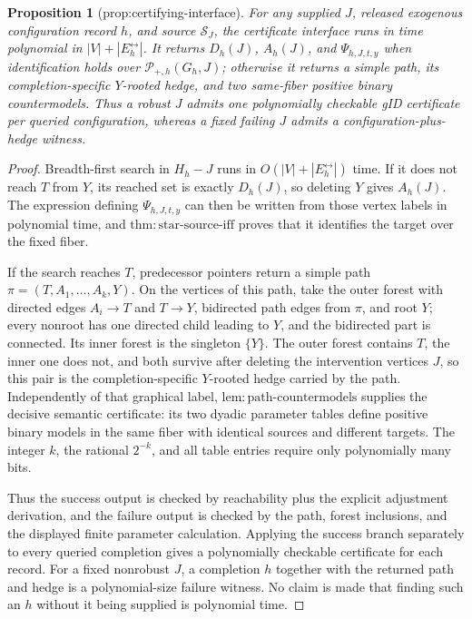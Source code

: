\documentclass{article}
\newtheorem{proposition}{Proposition}
\begin{document}
\begin{proposition}[prop:certifying-interface]\label{prop:certifying-interface}
For any supplied \(J\), released exogenous configuration record \(h\), and source \(\mathcal S_J\), the certificate interface runs in time polynomial in \(|V|+|E_h^{\leftrightarrow}|\). It returns \(D_h(J)\), \(A_h(J)\), and \(\Psi_{h,J,t,y}\) when identification holds over \(\mathcal P_{+,h}(G_h,J)\); otherwise it returns a simple path, its completion-specific \(Y\)-rooted hedge, and two same-fiber positive binary countermodels. Thus a robust \(J\) admits one polynomially checkable gID certificate per queried configuration, whereas a fixed failing \(J\) admits a configuration-plus-hedge witness.
\end{proposition}
\begin{proof}
Breadth-first search in \(H_h-J\) runs in \(O(|V|+|E_h^{\leftrightarrow}|)\) time.  If it does not reach \(T\) from \(Y\), its reached set is exactly \(D_h(J)\), so deleting \(Y\) gives \(A_h(J)\).  The expression defining \(\Psi_{h,J,t,y}\) can then be written from those vertex labels in polynomial time, and \(\mathrm{thm{:}star\text{-}source\text{-}iff}\) proves that it identifies the target over the fixed fiber.

If the search reaches \(T\), predecessor pointers return a simple path \(\pi=(T,A_1,\ldots,A_k,Y)\).  On the vertices of this path, take the outer forest with directed edges \(A_i\to T\) and \(T\to Y\), bidirected path edges from \(\pi\), and root \(Y\); every nonroot has one directed child leading to \(Y\), and the bidirected part is connected.  Its inner forest is the singleton \(\{Y\}\).  The outer forest contains \(T\), the inner one does not, and both survive after deleting the intervention vertices \(J\), so this pair is the completion-specific \(Y\)-rooted hedge carried by the path.  Independently of that graphical label, \(\mathrm{lem{:}path\text{-}countermodels}\) supplies the decisive semantic certificate: its two dyadic parameter tables define positive binary models in the same fiber with identical sources and different targets.  The integer \(k\), the rational \(2^{-k}\), and all table entries require only polynomially many bits.

Thus the success output is checked by reachability plus the explicit adjustment derivation, and the failure output is checked by the path, forest inclusions, and the displayed finite parameter calculation.  Applying the success branch separately to every queried completion gives a polynomially checkable certificate for each record.  For a fixed nonrobust \(J\), a completion \(h\) together with the returned path and hedge is a polynomial-size failure witness.  No claim is made that finding such an \(h\) without it being supplied is polynomial time.
\end{proof}
\end{document}
